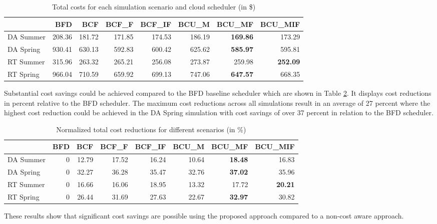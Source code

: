 \begin{table}[ht]
\centering
\begin{tabular}{lrrrrrrr}
\toprule
{} &     BFD &     BCF &   BCF\_F &  BCF\_IF &   BCU\_M &  BCU\_MF &  BCU\_MIF \\
\midrule
DA Summer &  208.36 &  181.72 &  171.85 &  174.53 &  186.19 &  \textbf{169.86} &   173.29 \\
DA Spring &  930.41 &  630.13 &  592.83 &  600.42 &  625.62 &  \textbf{585.97} &   595.81 \\
RT Summer &  315.96 &  263.32 &  265.21 &  256.08 &  273.87 &  259.98 &   \textbf{252.09} \\
RT Spring &  966.04 &  710.59 &  659.92 &  699.13 &  747.06 &  \textbf{647.57} &   668.35 \\
\bottomrule
\end{tabular}
\caption{Total costs for each simulation scenario and cloud scheduler (in \$)}
\label{tab:total_cost_per_simulation}
\end{table}

Substantial cost savings could be achieved compared to the BFD baseline scheduler which are shown in Table \ref{tab:total_cost_reduction_per_simulation}. It displays cost reductions in percent relative to the BFD scheduler. The maximum cost reductions across all simulations result in an average of 27 percent where the highest cost reduction could be achieved in the DA Spring simulation with cost savings of over 37 percent in relation to the BFD scheduler. 

\begin{table}[ht]
\centering
\begin{tabular}{lrrrrrrr}
\toprule
{} &  BFD &    BCF &  BCF\_F &  BCF\_IF &  BCU\_M &  BCU\_MF &  BCU\_MIF \\
\midrule
DA Summer &    0 &  12.79 &  17.52 &   16.24 &  10.64 &   \textbf{18.48} &    16.83 \\
DA Spring &    0 &  32.27 &  36.28 &   35.47 &  32.76 &   \textbf{37.02} &    35.96 \\
RT Summer &    0 &  16.66 &  16.06 &   18.95 &  13.32 &   17.72 &    \textbf{20.21} \\
RT Spring &    0 &  26.44 &  31.69 &   27.63 &  22.67 &   \textbf{32.97} &    30.82 \\
\bottomrule
\end{tabular}
\caption{Normalized total cost reductions for different scenarios (in \%)}
\label{tab:total_cost_reduction_per_simulation}
\end{table}

These results show that significant cost savings are possible using the proposed approach compared to a non-cost aware approach. 



